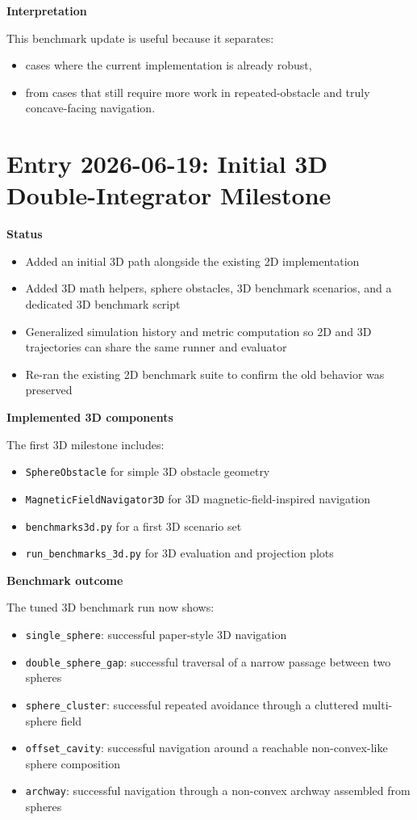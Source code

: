 \documentclass[11pt]{article}
\begin{document}
\textbf{Interpretation}

This benchmark update is useful because it separates:

\begin{itemize}[leftmargin=*]
  \item cases where the current implementation is already robust,
  \item from cases that still require more work in repeated-obstacle and truly concave-facing navigation.
\end{itemize}

\section*{Entry 2026-06-19: Initial 3D Double-Integrator Milestone}

\textbf{Status}

\begin{itemize}[leftmargin=*]
  \item Added an initial 3D path alongside the existing 2D implementation
  \item Added 3D math helpers, sphere obstacles, 3D benchmark scenarios, and a dedicated 3D benchmark script
  \item Generalized simulation history and metric computation so 2D and 3D trajectories can share the same runner and evaluator
  \item Re-ran the existing 2D benchmark suite to confirm the old behavior was preserved
\end{itemize}

\textbf{Implemented 3D components}

The first 3D milestone includes:

\begin{itemize}[leftmargin=*]
  \item \texttt{SphereObstacle} for simple 3D obstacle geometry
  \item \texttt{MagneticFieldNavigator3D} for 3D magnetic-field-inspired navigation
  \item \texttt{benchmarks3d.py} for a first 3D scenario set
  \item \texttt{run\_benchmarks\_3d.py} for 3D evaluation and projection plots
\end{itemize}

\textbf{Benchmark outcome}

The tuned 3D benchmark run now shows:

\begin{itemize}[leftmargin=*]
  \item \texttt{single\_sphere}: successful paper-style 3D navigation
  \item \texttt{double\_sphere\_gap}: successful traversal of a narrow passage between two spheres
  \item \texttt{sphere\_cluster}: successful repeated avoidance through a cluttered multi-sphere field
  \item \texttt{offset\_cavity}: successful navigation around a reachable non-convex-like sphere composition
  \item \texttt{archway}: successful navigation through a non-convex archway assembled from spheres
\end{itemize}
\end{document}

